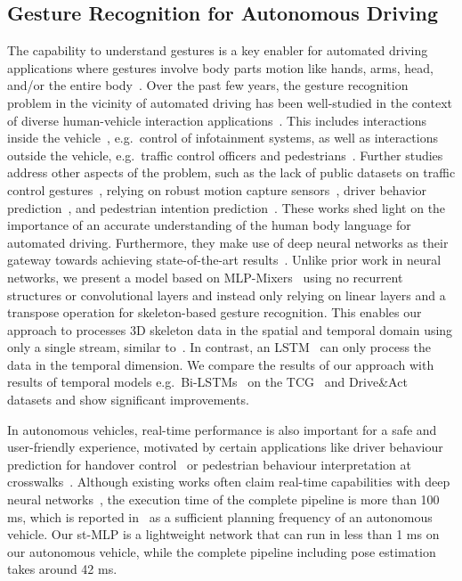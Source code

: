 \documentclass[letterpaper, 10 pt, conference]{ieeeconf}
\begin{document}
\subsection{Gesture Recognition for Autonomous Driving}

The capability to understand gestures is a key enabler for automated driving applications where gestures involve body parts motion like hands, arms, head, and/or the entire body~\cite{mitra2007gesture}. Over the past few years, the gesture recognition problem in the vicinity of automated driving has been well-studied in the context of diverse human-vehicle interaction applications~\cite{rautaray2015vision,rasouli2019autonomous}. This includes interactions inside the vehicle~\cite{Sachara2017,pickering2007research,ohn2013vehicle}, e.g.~control of infotainment systems, as well as interactions outside the vehicle, e.g.~traffic control officers and pedestrians~\cite{Zengler2018,gupta2016conventionalized}. Further studies address other aspects of the problem, such as the lack of public datasets on traffic control gestures~\cite{wiederer2020traffic}, relying on robust motion capture sensors~\cite{geng2020using}, driver behavior prediction~\cite{martin2019drive}, and pedestrian intention prediction~\cite{8317766, 8370119, 8500425}. These works shed light on the importance of an accurate understanding of the human body language for automated driving. Furthermore, they make use of deep neural networks as their gateway towards achieving state-of-the-art results~\cite{nunez2018convolutional,lindgren2018learned,Molchanov2015}. Unlike prior work in neural networks, we present a model based on MLP-Mixers~\cite{tolstikhin2021mlp} using no recurrent structures or convolutional layers and instead only relying on linear layers and a transpose operation for skeleton-based gesture recognition. This enables our approach to processes 3D skeleton data in the spatial and temporal domain using only a single stream, similar to~\cite{yan2018spatial}. In contrast, an LSTM~\cite{hochreiter1997long} can only process the data in the temporal dimension. We compare the results of our approach with results of temporal models e.g.~Bi-LSTMs~\cite{zou2019deep} on the TCG~\cite{wiederer2020traffic} and Drive\&Act~\cite{drive_and_act_2019_iccv} datasets and show significant improvements.

In autonomous vehicles, real-time performance is also important for a safe and user-friendly experience, motivated by certain applications like driver behaviour prediction for handover control~\cite{deo2019looking} or pedestrian behaviour interpretation at crosswalks~\cite{deb2018investigating}. Although existing works often claim real-time capabilities with deep neural networks~\cite{Ehrnsperger2020,Choi2019}, the execution time of the complete pipeline is more than 100 ms, which is reported in~\cite{BROGGI2012161} as a sufficient planning frequency of an autonomous vehicle. Our st-MLP is a lightweight network that can run in less than 1 ms on our autonomous vehicle, while the complete pipeline including pose estimation takes around 42 ms.
\end{document}
